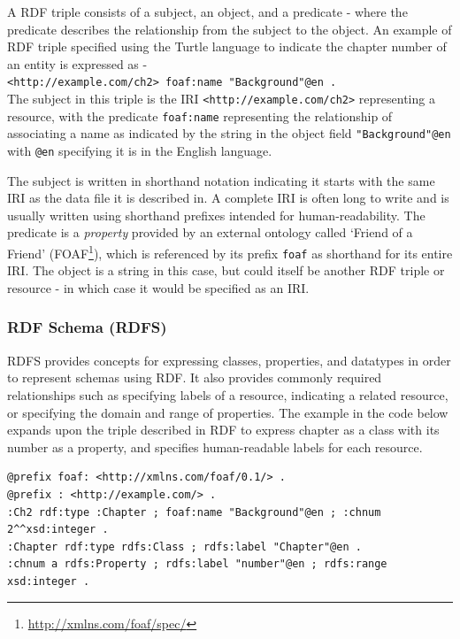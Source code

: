 A RDF triple consists of a subject, an object, and a predicate - where the predicate describes the relationship from the subject to the object. An example of RDF triple specified using the Turtle language to indicate the chapter number of an entity is expressed as -\\ \-\hspace{5mm}\texttt{<http://example.com/ch2> foaf:name "Background"@en .}\\
The subject in this triple is the IRI \texttt{<http://example.com/ch2>} representing a resource, with the predicate \texttt{foaf:name} representing the relationship of associating a name as indicated by the string in the object field \texttt{"Background"@en} with \texttt{@en} specifying it is in the English language. 

The subject is written in shorthand notation indicating it starts with the same IRI as the data file it is described in. A complete IRI is often long to write and is usually written using shorthand prefixes intended for human-readability.
The predicate is a \textit{property} provided by an external ontology called `Friend of a Friend' (FOAF\footnote{\url{http://xmlns.com/foaf/spec/}}), which is referenced by its prefix \texttt{foaf} as shorthand for its entire IRI.
The object is a string in this case, but could itself be another RDF triple or resource - in which case it would be specified as an IRI.

\subsubsection{RDF Schema (RDFS)}
RDFS provides concepts for expressing classes, properties, and datatypes in order to represent schemas using RDF. It also provides commonly required relationships such as specifying labels of a resource, indicating a related resource, or specifying the domain and range of properties. The example in the code below expands upon the triple described in RDF to express chapter as a class with its number as a property, and specifies human-readable labels for each resource.
\begin{verbatim}
@prefix foaf: <http://xmlns.com/foaf/0.1/> .
@prefix : <http://example.com/> .
:Ch2 rdf:type :Chapter ; foaf:name "Background"@en ; :chnum 2^^xsd:integer .
:Chapter rdf:type rdfs:Class ; rdfs:label "Chapter"@en .
:chnum a rdfs:Property ; rdfs:label "number"@en ; rdfs:range xsd:integer .
\end{verbatim}

